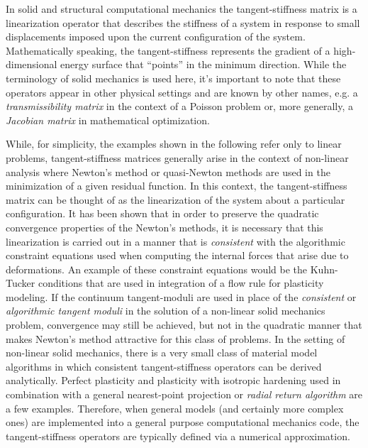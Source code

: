 \documentclass[preprint,12pt]{elsarticle}
\begin{document}
In solid and structural computational mechanics the tangent-stiffness matrix is
a linearization operator that describes the stiffness of a system in response
to small displacements imposed upon the current configuration of the system.
Mathematically speaking, the tangent-stiffness represents the gradient of a
high-dimensional energy surface that ``points'' in the minimum direction. While
the terminology of solid mechanics is used here, it's important to note that
these operators appear in other physical settings and are known by other names,
e.g. a \emph{transmissibility matrix} in the context of a Poisson problem or,
more generally, a \emph{Jacobian matrix} in mathematical optimization.

While, for simplicity, the examples shown in the following refer only to linear
problems, tangent-stiffness matrices generally arise in the context of
non-linear analysis where Newton's method or quasi-Newton methods are used
in the minimization of a given residual function.  In this context, the
tangent-stiffness matrix can be thought of as the linearization of the system
about a particular configuration.  It has been shown
\cite{hughes1978consistent,hughes1978unconditionally} that in order to preserve
the quadratic convergence properties of the Newton's methods, it is necessary
that this linearization is carried out in a manner that is \emph{consistent}
with the algorithmic constraint equations used when computing the internal
forces that arise due to deformations.  An example of these constraint
equations would be the Kuhn-Tucker conditions \cite{simo1998} that are used in
integration of a flow rule for plasticity modeling.  If the continuum
tangent-moduli are used in place of the \emph{consistent} or \emph{algorithmic
tangent moduli} in the solution of a non-linear solid mechanics problem,
convergence may still be achieved, but not in the quadratic manner that makes
Newton's method attractive for this class of problems.  In the setting of
non-linear solid mechanics, there is a very small class of material model
algorithms in which consistent tangent-stiffness operators can be derived
analytically.  Perfect plasticity and plasticity with isotropic hardening used
in combination with a general nearest-point projection or \emph{radial return
algorithm} are a few examples.  Therefore, when general models (and certainly
more complex ones) are implemented into a general purpose computational
mechanics code, the tangent-stiffness operators are typically defined via a
numerical approximation.  
\end{document}
